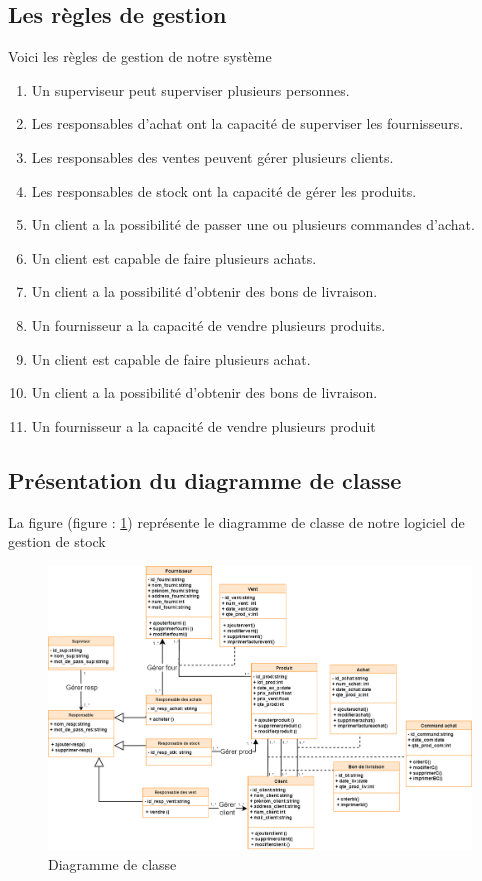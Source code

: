 \documentclass[edit,12pt,a4paper,ChapStyle,oneside,doubleinterligne]{report}
\begin{document}
\subsection{Les règles de gestion}
Voici les règles de gestion de notre système 
\begin{enumerate}
    \item Un superviseur peut superviser plusieurs personnes.
    \item Les responsables d’achat ont la capacité de superviser les fournisseurs.
    \item Les responsables des ventes peuvent gérer plusieurs clients.
    \item Les responsables de stock ont la capacité de gérer les produits.
    \item Un client a la possibilité de passer une ou plusieurs commandes d'achat.
    \item Un client est capable de faire plusieurs achats.
    \item Un client a la possibilité d'obtenir des bons de livraison.
    \item Un fournisseur a la capacité de vendre plusieurs produits.
    \item Un client est capable de faire plusieurs achat.
    \item Un client a la possibilité d'obtenir des bons de livraison.
    \item Un fournisseur a la capacité de vendre plusieurs produit
\end{enumerate}
\clearpage
\subsection{Présentation du diagramme de classe}
La figure (figure : \ref{fig:diag_classl}) représente le diagramme de classe de notre logiciel de gestion de stock 
\begin{figure}[h!]
\centering
\includegraphics[width=1\textwidth]{images/diagramme de class L.png}
\caption{Diagramme de classe}\label{fig:diag_classl}
\end{figure}
\end{document}
